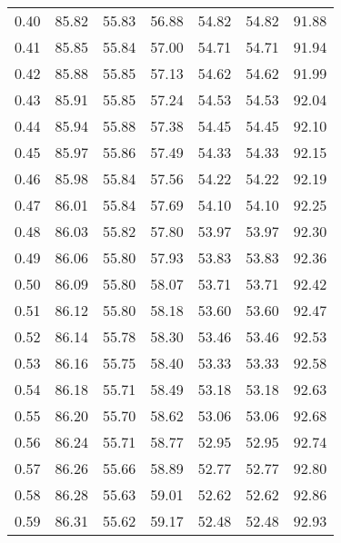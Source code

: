 \begin{tabular}{|c|c|c|c|c|c|c|}
      0.40 &     85.82 &     55.83 &      56.88 &   54.82 &      54.82 &         91.88 \\
      0.41 &     85.85 &     55.84 &      57.00 &   54.71 &      54.71 &         91.94 \\
      0.42 &     85.88 &     55.85 &      57.13 &   54.62 &      54.62 &         91.99 \\
      0.43 &     85.91 &     55.85 &      57.24 &   54.53 &      54.53 &         92.04 \\
      0.44 &     85.94 &     55.88 &      57.38 &   54.45 &      54.45 &         92.10 \\
      0.45 &     85.97 &     55.86 &      57.49 &   54.33 &      54.33 &         92.15 \\
      0.46 &     85.98 &     55.84 &      57.56 &   54.22 &      54.22 &         92.19 \\
      0.47 &     86.01 &     55.84 &      57.69 &   54.10 &      54.10 &         92.25 \\
      0.48 &     86.03 &     55.82 &      57.80 &   53.97 &      53.97 &         92.30 \\
      0.49 &     86.06 &     55.80 &      57.93 &   53.83 &      53.83 &         92.36 \\
      0.50 &     86.09 &     55.80 &      58.07 &   53.71 &      53.71 &         92.42 \\
      0.51 &     86.12 &     55.80 &      58.18 &   53.60 &      53.60 &         92.47 \\
      0.52 &     86.14 &     55.78 &      58.30 &   53.46 &      53.46 &         92.53 \\
      0.53 &     86.16 &     55.75 &      58.40 &   53.33 &      53.33 &         92.58 \\
      0.54 &     86.18 &     55.71 &      58.49 &   53.18 &      53.18 &         92.63 \\
      0.55 &     86.20 &     55.70 &      58.62 &   53.06 &      53.06 &         92.68 \\
      0.56 &     86.24 &     55.71 &      58.77 &   52.95 &      52.95 &         92.74 \\
      0.57 &     86.26 &     55.66 &      58.89 &   52.77 &      52.77 &         92.80 \\
      0.58 &     86.28 &     55.63 &      59.01 &   52.62 &      52.62 &         92.86 \\
      0.59 &     86.31 &     55.62 &      59.17 &   52.48 &      52.48 &         92.93 \\

\end{tabular}
